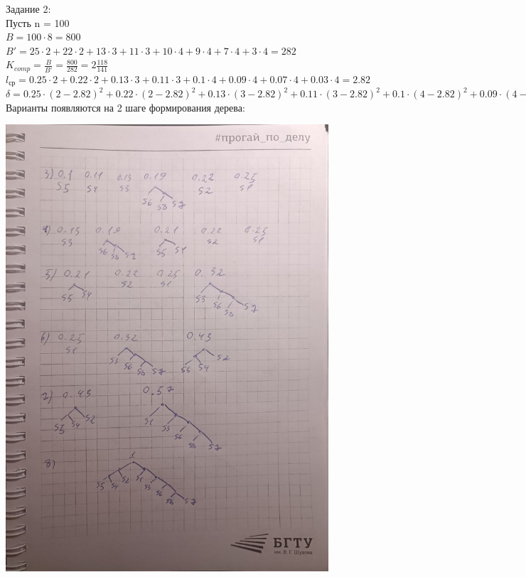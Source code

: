 \documentclass[a4paper,14pt]{extarticle}
\begin{document}
Задание 2:\\
Пусть n = 100\\
$B = 100 \cdot 8 = 800$\\
$B' = 25 \cdot 2 + 22 \cdot 2 + 13 \cdot 3 + 11 \cdot 3 + 10 \cdot 4 + 9 \cdot 4 + 7 \cdot 4 + 3 \cdot 4 = 282$\\
$K_{comp} = \frac{B}{B'} = \frac{800}{282} = 2\frac{118}{141}$\\
$l_{ср} = 0.25 \cdot 2 + 0.22 \cdot 2 + 0.13 \cdot 3 + 0.11 \cdot 3 + 0.1 \cdot 4 + 0.09 \cdot 4 + 0.07 \cdot 4 + 0.03 \cdot 4 = 2.82$\\
$\delta = 0.25 \cdot (2 - 2.82)^2 + 0.22 \cdot (2 - 2.82)^2 + 0.13 \cdot (3 - 2.82)^2 + 0.11 \cdot (3 - 2.82)^2 + 0.1 \cdot (4 - 2.82)^2 + 0.09 \cdot (4 - 2.82)^2 + 0.07 \cdot (4 - 2.82)^2 + 0.03 \cdot (4 - 2.82)^2 = 0.7276$\\

Варианты появляются на 2 шаге формирования дерева:
\begin{center}
    \includegraphics[width=120mm]{task2_var1.jpg}\\
\end{center}
\end{document}
